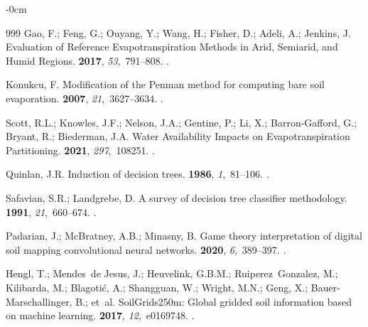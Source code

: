 \documentclass[land,review,accept,pdftex,oneauthor]{Definitions/mdpi}
\begin{document}
\begin{adjustwidth}{-\extralength}{0cm}
\begin{thebibliography}{999}
Gao, F.; Feng, G.; Ouyang, Y.; Wang, H.; Fisher, D.; Adeli, A.; Jenkins, J.
\newblock Evaluation of Reference Evapotranspiration Methods in Arid, Semiarid,
  and Humid Regions.
 {\bf
  2017}, {\em 53},~791--808.
.

Konukcu, F.
\newblock Modification of the Penman method for computing bare soil
  evaporation.
 {\bf 2007}, {\em 21},~3627--3634.
.

Scott, R.L.; Knowles, J.F.; Nelson, J.A.; Gentine, P.; Li, X.; Barron-Gafford,
  G.; Bryant, R.; Biederman, J.A.
\newblock Water Availability Impacts on Evapotranspiration Partitioning.
 {\bf 2021}, {\em
  297},~108251.
.

Quinlan, J.R.
\newblock Induction of decision trees.
 {\bf 1986}, {\em 1},~81--106.
.

Safavian, S.R.; Landgrebe, D.
\newblock A survey of decision tree classifier methodology.
 {\bf 1991},
  {\em 21},~660--674.
.

Padarian, J.; McBratney, A.B.; Minasny, B.
\newblock Game theory interpretation of digital soil mapping convolutional
  neural networks.
 {\bf 2020}, {\em 6},~389--397.
.

Hengl, T.; Mendes~de Jesus, J.; Heuvelink, G.B.M.; Ruiperez~Gonzalez, M.;
  Kilibarda, M.; Blagoti{\'c}, A.; Shangguan, W.; Wright, M.N.; Geng, X.;
  Bauer-Marschallinger, B.;  et~al.
\newblock SoilGrids250m: Global gridded soil information based on machine
  learning. %
 {\bf 2017}, {\em 12},~e0169748.
.


\end{thebibliography}
\end{adjustwidth}
\end{document}
